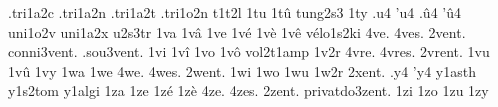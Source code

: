 {                    .tri1a2c
                    .tri1a2n
                    .tri1a2t
                    .tri1o2n
                    t1t2l
1tu
1t\^u
tung2s3
1ty
.u4
'u4
.\^u4
'\^u4
                    uni1o2v
                    uni1a2x
                    u2s3tr
1va
1v\^a
1ve
1v\'e
1v\`e
1v\^e
                    v\'elo1s2ki
4ve.
4ves.
     2vent.
conni3vent.
 .sou3vent.
%
1vi
1v\^i
1vo
1v\^o
                    vol2t1amp
1v2r
4vre.
4vres.
2vrent. %
1vu
1v\^u
1vy
1wa
1we
4we.
4wes.
2went. %
1wi
1wo
1wu
1w2r
2xent. %
.y4
'y4
                    y1asth
                    y1s2tom
                    y1algi
1za
1ze
1z\'e
1z\`e
4ze.
4zes.
        2zent.
privatdo3zent.
%
1zi
1zo
1zu
1zy
}
\endgroup
\endinput
